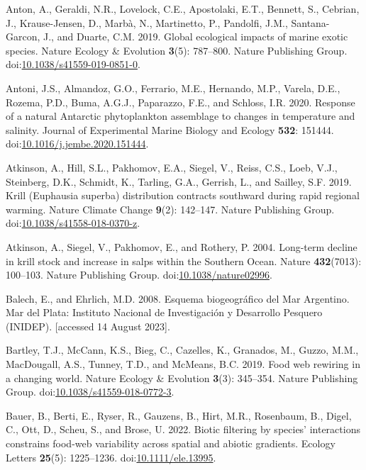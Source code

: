 \documentclass[
]{article}
\newlength{\cslhangindent}
\newenvironment{CSLReferences}[2] %
 {\begin{list}{}{%
  \setlength{\itemindent}{0pt}
  \setlength{\leftmargin}{0pt}
  \setlength{\parsep}{0pt}
  \ifodd #1
   \setlength{\leftmargin}{\cslhangindent}
   \setlength{\itemindent}{-1\cslhangindent}
  \fi
  \setlength{\itemsep}{#2\baselineskip}}}
 {\end{list}}
\begin{document}
\begin{CSLReferences}{1}{0}
Anton, A., Geraldi, N.R., Lovelock, C.E., Apostolaki, E.T., Bennett, S.,
Cebrian, J., Krause-Jensen, D., Marbà, N., Martinetto, P., Pandolfi,
J.M., Santana-Garcon, J., and Duarte, C.M. 2019. Global ecological
impacts of marine exotic species. Nature Ecology \& Evolution
\textbf{3}(5): 787--800. Nature Publishing Group.
doi:\href{https://doi.org/10.1038/s41559-019-0851-0}{10.1038/s41559-019-0851-0}.

Antoni, J.S., Almandoz, G.O., Ferrario, M.E., Hernando, M.P., Varela,
D.E., Rozema, P.D., Buma, A.G.J., Paparazzo, F.E., and Schloss, I.R.
2020. Response of a natural {Antarctic} phytoplankton assemblage to
changes in temperature and salinity. Journal of Experimental Marine
Biology and Ecology \textbf{532}: 151444.
doi:\href{https://doi.org/10.1016/j.jembe.2020.151444}{10.1016/j.jembe.2020.151444}.

Atkinson, A., Hill, S.L., Pakhomov, E.A., Siegel, V., Reiss, C.S., Loeb,
V.J., Steinberg, D.K., Schmidt, K., Tarling, G.A., Gerrish, L., and
Sailley, S.F. 2019. Krill ({Euphausia} superba) distribution contracts
southward during rapid regional warming. Nature Climate Change
\textbf{9}(2): 142--147. Nature Publishing Group.
doi:\href{https://doi.org/10.1038/s41558-018-0370-z}{10.1038/s41558-018-0370-z}.

Atkinson, A., Siegel, V., Pakhomov, E., and Rothery, P. 2004. Long-term
decline in krill stock and increase in salps within the {Southern
Ocean}. Nature \textbf{432}(7013): 100--103. Nature Publishing Group.
doi:\href{https://doi.org/10.1038/nature02996}{10.1038/nature02996}.

Balech, E., and Ehrlich, M.D. 2008. {Esquema biogeogr{á}fico del Mar
Argentino}. Mar del Plata: Instituto Nacional de Investigaci{ó}n y
Desarrollo Pesquero (INIDEP). {[}accessed 14 August 2023{]}.

Bartley, T.J., McCann, K.S., Bieg, C., Cazelles, K., Granados, M.,
Guzzo, M.M., MacDougall, A.S., Tunney, T.D., and McMeans, B.C. 2019.
Food web rewiring in a changing world. Nature Ecology \& Evolution
\textbf{3}(3): 345--354. Nature Publishing Group.
doi:\href{https://doi.org/10.1038/s41559-018-0772-3}{10.1038/s41559-018-0772-3}.

Bauer, B., Berti, E., Ryser, R., Gauzens, B., Hirt, M.R., Rosenbaum, B.,
Digel, C., Ott, D., Scheu, S., and Brose, U. 2022. Biotic filtering by
species' interactions constrains food-web variability across spatial and
abiotic gradients. Ecology Letters \textbf{25}(5): 1225--1236.
doi:\href{https://doi.org/10.1111/ele.13995}{10.1111/ele.13995}.


\end{CSLReferences}
\end{document}
